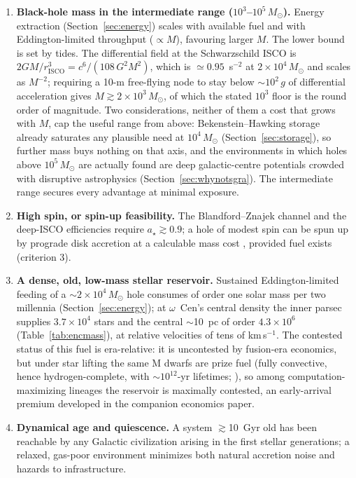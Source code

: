 \documentclass[11pt]{article}
\newcommand{\msun}{\ensuremath{M_\odot}}
\newcommand{\astar}{\ensuremath{a_\star}}
\begin{document}
\begin{enumerate}
\item \textbf{Black-hole mass in the intermediate range ($10^{3}$--$10^{5}\,\msun$).} Energy extraction (Section~\ref{sec:energy}) scales with available fuel and with Eddington-limited throughput ($\propto M$), favouring larger $M$. The lower bound is set by tides. The differential field at the Schwarzschild ISCO is $2GM/r_{\mathrm{ISCO}}^{3} = c^{6}/(108\,G^{2}M^{2})$, which is $\simeq 0.95$~s$^{-2}$ at $2\times10^{4}\,\msun$ and scales as $M^{-2}$; requiring a 10-m free-flying node to stay below $\sim$$10^{2}\,g$ of differential acceleration gives $M \gtrsim 2\times10^{3}\,\msun$, of which the stated $10^{3}$ floor is the round order of magnitude. Two considerations, neither of them a cost that grows with $M$, cap the useful range from above: Bekenstein--Hawking storage already saturates any plausible need at $10^{4}\,\msun$ (Section~\ref{sec:storage}), so further mass buys nothing on that axis, and the environments in which holes above $10^{5}\,\msun$ are actually found are deep galactic-centre potentials crowded with disruptive astrophysics (Section~\ref{sec:whynotsgra}). The intermediate range secures every advantage at minimal exposure.
\item \textbf{High spin, or spin-up feasibility.} The Blandford--Znajek channel and the deep-ISCO efficiencies require $\astar \gtrsim 0.9$; a hole of modest spin can be spun up by prograde disk accretion at a calculable mass cost \citep{Thorne1974}, provided fuel exists (criterion 3).
\item \textbf{A dense, old, low-mass stellar reservoir.} Sustained Eddington-limited feeding of a $\sim 2\times10^{4}\,\msun$ hole consumes of order one solar mass per two millennia (Section~\ref{sec:energy}); at $\omega$~Cen's central density the inner parsec supplies $3.7\times10^{4}$ stars and the central $\sim$10~pc of order $4.3\times10^{6}$ (Table~\ref{tab:encmass}), at relative velocities of tens of \mbox{km\,s$^{-1}$}. The contested status of this fuel is era-relative: it is uncontested by fusion-era economics, but under star lifting the same M dwarfs are prize fuel (fully convective, hence hydrogen-complete, with $\sim$$10^{12}$-yr lifetimes; \citealt{ScogginsKipping2023}), so among computation-maximizing lineages the reservoir is maximally contested, an early-arrival premium developed in the companion economics paper.
\item \textbf{Dynamical age and quiescence.} A system $\gtrsim$10~Gyr old has been reachable by any Galactic civilization arising in the first stellar generations; a relaxed, gas-poor environment minimizes both natural accretion noise and hazards to infrastructure.
\end{enumerate}
\end{document}
